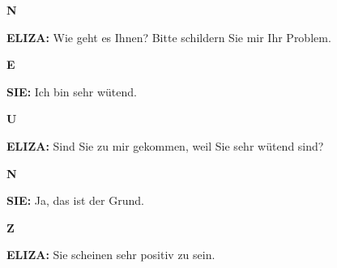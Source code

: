 \documentclass{article}
\begin{document}
\begin{minipage}[t]{0.13\textwidth}
  \centering
  {\bfseries\fontsize{14.4}{14.4}\selectfont\textcolor{pastelpink}{N}}
\end{minipage}%
\begin{minipage}[t]{0.81\textwidth}
  \textbf{ELIZA:} Wie geht es Ihnen? Bitte schildern Sie mir Ihr Problem.
\end{minipage}

\vspace{0.5cm}

\begin{minipage}[t]{0.13\textwidth}
  \centering
  {\bfseries\fontsize{14.4}{14.4}\selectfont\textcolor{pastelpink}{E}}
\end{minipage}%
\begin{minipage}[t]{0.81\textwidth}
  \textbf{SIE:} Ich bin sehr wütend.
\end{minipage}

\vspace{0.5cm}

\begin{minipage}[t]{0.13\textwidth}
  \centering
  {\bfseries\fontsize{14.4}{14.4}\selectfont\textcolor{pastelpink}{U}}
\end{minipage}%
\begin{minipage}[t]{0.81\textwidth}
  \textbf{ELIZA:} Sind Sie zu mir gekommen, weil Sie sehr wütend sind?
\end{minipage}

\vspace{0.5cm}

\begin{minipage}[t]{0.13\textwidth}
  \centering
  {\bfseries\fontsize{14.4}{14.4}\selectfont\textcolor{pastelpink}{N}}
\end{minipage}%
\begin{minipage}[t]{0.81\textwidth}
  \textbf{SIE:} Ja, das ist der Grund.
\end{minipage}

\vspace{0.5cm}

\begin{minipage}[t]{0.13\textwidth}
  \centering
  {\bfseries\fontsize{14.4}{14.4}\selectfont\textcolor{pastelpink}{Z}}
\end{minipage}%
\begin{minipage}[t]{0.81\textwidth}
  \textbf{ELIZA:} Sie scheinen sehr positiv zu sein.
\end{minipage}

\vspace{0.5cm}
\end{document}
